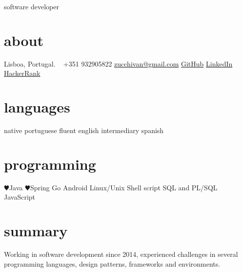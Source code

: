 \documentclass[]{friggeri-cv}
\begin{document}
       {software developer}


\begin{aside}
  \section{about}
    Lisboa,
    Portugal.
    ~
    +351 932905822
    \href{mailto:zucchivan@gmail.com}{zucchivan@gmail.com}
    \faGithub \hspace{0pt} \href{https://github.com/zucchivan/}{GitHub}
    \faLinkedin \hspace{0pt} \href{http://linkedin.com/zucchivan}{LinkedIn}
    \faHackerrank \hspace{0pt} \href{https://www.hackerrank.com/zucchivan}{HackerRank}
  \section{languages}
    native portuguese
    fluent english
    intermediary spanish
  \section{programming}
    {\color{red} $\varheartsuit$}Java
    {\color{red} $\varheartsuit$}Spring
    Go
    Android
    Linux/Unix
    Shell script
    SQL and PL/SQL
    JavaScript
\end{aside}

\section{summary}
    Working in software development since 2014, experienced challenges in several programming languages, design patterns, frameworks and environments. 
\end{document}
